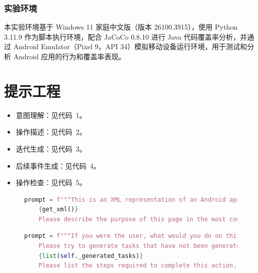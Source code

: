 \documentclass[twocolumn, 10pt]{article}
\begin{document}
\subsubsection{实验环境}

本实验环境基于 Windows 11 家庭中文版（版本 26100.3915），使用 Python 3.11.9 作为脚本执行环境，配合 JaCoCo 0.8.10 进行 Java 代码覆盖率分析，并通过 Android Emulator（Pixel 9，API 34）模拟移动设备运行环境，用于测试和分析 Android 应用的行为和覆盖率表现。

\appendix

\section{提示工程}
\label{sec:prompt}

\begin{itemize}
    \item 意图理解：见代码~1。
    \item 操作描述：见代码~2。
    \item 迭代生成：见代码~3。
    \item 后续事件生成：见代码~4。
    \item 操作检查：见代码~5。
\end{itemize}

\begin{figure}[t]
\centering
\begin{lstlisting}[language=Python,caption=意图理解]
    prompt = f"""This is an XML representation of an Android application page:
    {get_xml()}
    Please describe the purpose of this page in the most concise language possible."""
\end{lstlisting}
\label{fig:intent}
\end{figure}

\begin{figure}[t]
\centering
\begin{lstlisting}[language=python, caption=操作描述]
    prompt = f"""If you were the user, what would you do on this page? You can only describe one action. 
    Please try to generate tasks that have not been generated before. Below are the tasks that have already been generated:
    {list(self._generated_tasks)}
    Please list the steps required to complete this action. (This action will be named 'The Task')"""
\end{lstlisting}
\label{fig:action}
\end{figure}
\end{document}
